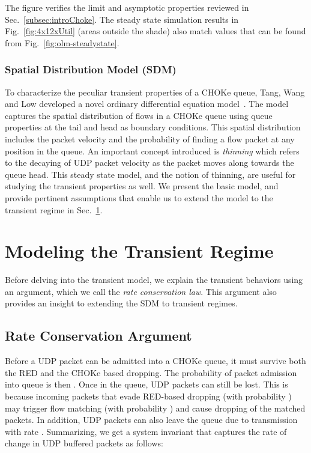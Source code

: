 \documentclass{IEEEtran}
\begin{document}
      The figure verifies the limit and asymptotic properties reviewed in Sec.~\ref{subsec:introChoke}. The  steady state simulation results in Fig.~\ref{fig:4x12xUtil} (areas outside the shade) also match  values that can be found from Fig.~\ref{fig:olm-steadystate}.

    \subsubsection{Spatial Distribution Model (SDM)}
        To characterize the peculiar transient properties of a CHOKe queue, Tang, Wang and Low developed a novel ordinary differential equation model~\cite{ChokeToN04}. The model captures the spatial distribution of flows in a CHOKe queue using queue properties at the tail and head as boundary conditions. This spatial distribution includes the packet velocity and the probability of finding a flow packet at any position in the queue. An important concept introduced is \emph{thinning} which refers to the decaying of UDP packet velocity as the packet moves along towards the queue head. This steady state model, and the notion of thinning, are useful for studying the transient properties as well. We present the basic model, and provide pertinent assumptions that enable us to extend the model to the transient regime in Sec.~\ref{sec:modifiedSDM}.


    \section{Modeling the Transient Regime}\label{sec:modifiedSDM}
    Before delving into the transient model, we explain the transient behaviors using an argument, which we call the \emph{rate conservation law}. This argument also provides an insight to extending the SDM to transient regimes.
\subsection{Rate Conservation Argument}\label{subsec:rateConservation}
    Before a UDP packet can be admitted into a CHOKe queue, it must survive both the RED and the CHOKe based dropping. The probability of packet admission into queue is then . Once in the queue, UDP packets can still be lost. This is because incoming packets that evade RED-based dropping (with probability ) may trigger flow matching (with probability ) and cause dropping of the matched packets. In addition, UDP packets can also leave the queue due to transmission with rate . Summarizing, we get a system invariant that captures the rate of change in UDP buffered packets as follows:
    
\end{document}
